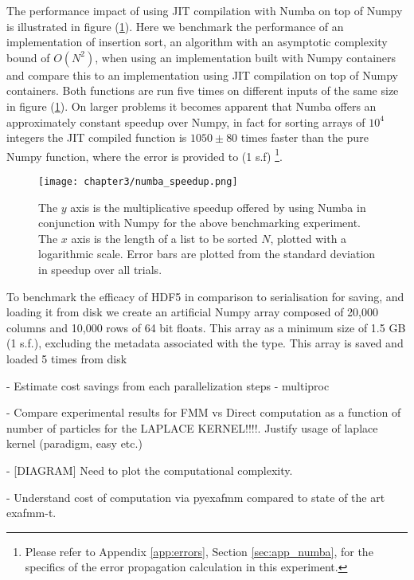 The performance impact of using \gls{JIT} compilation with Numba on top of Numpy
is illustrated in figure (\ref{fig:3_1_numba}). Here we benchmark the performance
of an implementation of insertion sort, an algorithm with an asymptotic complexity
bound of $O(N^2)$, when using an implementation built with Numpy containers and
compare this to an implementation using JIT compilation on top of Numpy containers.
Both functions are run five times on different inputs of the same size
in figure (\ref{fig:3_1_numba}). On larger problems it becomes apparent
that Numba offers an approximately constant speedup over Numpy, in fact for
sorting arrays of $10^4$ integers the JIT compiled function is $1050 \pm 80$
times faster than the pure Numpy function, where the error is provided to (1 s.f)
\footnote{Please refer to Appendix \ref{app:errors}, Section \ref{sec:app_numba},
for the specifics of the error propagation calculation in this experiment.}.

\begin{figure}[!h]
    \centering

  {\texttt{[image: chapter3/numba\_speedup.png]}}
  \vspace{0pt}
    \caption{The $y$ axis is the multiplicative speedup offered by using Numba in
    conjunction with Numpy for the above benchmarking experiment. The $x$ axis is
    the length of a list to be sorted $N$, plotted with a logarithmic scale. Error
    bars are plotted from the standard deviation in speedup over all trials.}
    \label{fig:3_1_numba}
\end{figure}

To benchmark the efficacy of HDF5 in comparison to serialisation for saving,
and loading it from disk we create an artificial Numpy array composed of
20,000 columns and 10,000 rows of 64 bit floats. This array as a minimum size
of 1.5 GB (1 s.f.), excluding the metadata associated with the type.
This array is saved and loaded 5 times from disk

- Estimate cost savings from each parallelization steps
    - multiproc

- Compare experimental results for FMM vs Direct computation as a function of number of particles for the LAPLACE KERNEL!!!!. Justify usage of laplace kernel (paradigm, easy etc.)

- [DIAGRAM] Need to plot the computational complexity.

- Understand cost of computation via pyexafmm compared to state of the art exafmm-t.

